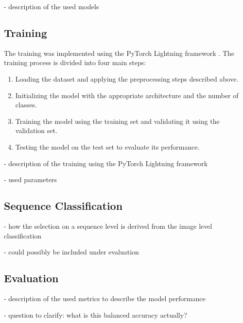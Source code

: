     - description of the used models

    \subsection{Training}

    The training was implemented using the PyTorch Lightning framework \autocite{falconPyTorchLightning2025}.
    The training process is divided into four main steps:
    \begin{enumerate}
        \item Loading the dataset and applying the preprocessing steps described above.
        \item Initializing the model with the appropriate architecture and the number of classes.
        \item Training the model using the training set and validating it using the validation set.
        \item Testing the model on the test set to evaluate its performance.
    \end{enumerate}

    - description of the training using the PyTorch Lightning framework 

    - used parameters

    \subsection{Sequence Classification}
    - how the selection on a sequence level is derived from the image level classification

    - could possibly be included under evaluation

    \subsection{Evaluation}
    - description of the used metrics to describe the model performance

    - question to clarify: what is this balanced accuracy actually?
